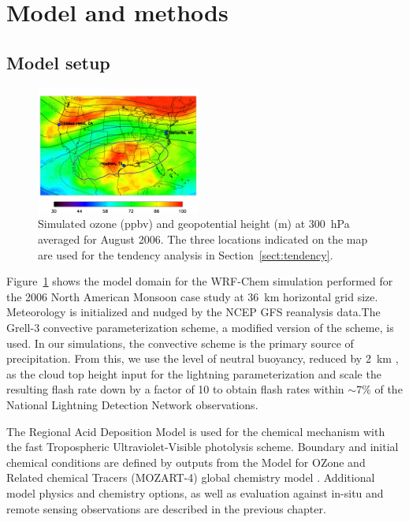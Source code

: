 \section{Model and methods}\label{sect:model}

\subsection{Model setup}

\begin{figure}
	\centering
	\begin{singlespacing}
	\vspace{-.4in}
	\includegraphics[width=0.48\textwidth]{Figures/o3_map.png}
	\caption[Simulated August mean ozone and geopotential heights at 300~hPa]{{\small
	Simulated ozone (ppbv) and geopotential height (m) at 300~hPa averaged for August 2006. The three locations indicated on the map
	are used for the tendency analysis in Section~\ref{sect:tendency}.}}
	\label{fig:o3_map2}
	\end{singlespacing}
\end{figure}

Figure~\ref{fig:o3_map2} shows the model domain for the WRF-Chem simulation performed
for the 2006 North American Monsoon case study at 36~km horizontal grid size. Meteorology
is initialized and nudged by the NCEP GFS reanalysis data.The Grell-3 convective
parameterization scheme, a modified version of the \citet{Grell:2002bs} scheme, is used.
In our simulations, the convective scheme is the primary source of precipitation.
From this, we use the level of neutral buoyancy, reduced by 2~km \citep{Wong:2013vn},
as the cloud top height input for the
\citet{Price:1992wb} lightning parameterization and scale the resulting flash rate down by a factor of 10 to obtain flash rates within $\sim7\%$ of
the National Lightning Detection Network \citep[NLDN;][]{Cummins:2009aa} observations.

The Regional Acid Deposition Model \citep[RADM2;][]{Stockwell:1990ez} is used for
the chemical mechanism with the fast Tropospheric Ultraviolet-Visible
\citep[FTUV;][]{Tie:2003ve} photolysis scheme. Boundary and initial chemical conditions are defined
by outputs from the Model for OZone and Related chemical Tracers (MOZART-4)
global chemistry model \citep{Emmons:2010fk}.
Additional model physics and chemistry options, as well as evaluation against
in-situ and remote sensing observations are described in the previous chapter.

